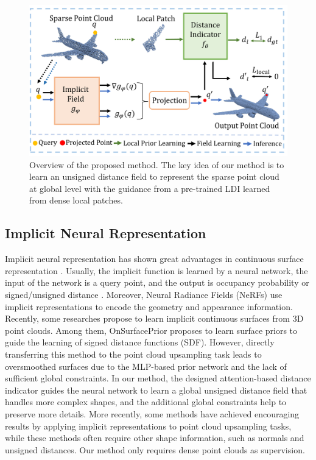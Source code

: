 \documentclass[letterpaper]{article} %
\begin{document}
\begin{figure}
\centering
\includegraphics[width=0.95\linewidth]{overview_part1.pdf}
\caption{Overview of the proposed method. The key idea of our method is to learn an unsigned distance field to represent the sparse point cloud at global level with the guidance from a pre-trained LDI learned from dense local patches.}
\label{fig:overview}
\end{figure} 

\subsection{Implicit Neural Representation}
Implicit neural representation has shown great advantages in continuous surface representation \cite{zhang2023fast, ma2023towards}. Usually, the implicit function is learned by a neural network, the input of the network is a query point, and the output is occupancy probability \cite{mescheder2019occupancy, chen2019learning} or signed/unsigned distance \cite{park2019deepsdf, michalkiewicz2019implicit}. Moreover, Neural Radiance Fields (NeRFs) \cite{mildenhall2021nerf} use implicit representations to encode the geometry and appearance information. Recently, some researches \cite{ ma2022reconstructing, zhou2023levelset, jin2023multi, chen2023gridpull} propose to learn implicit continuous surfaces from 3D point clouds. Among them, OnSurfacePrior \cite{ma2022reconstructing} proposes to learn surface priors to guide the learning of signed distance functions (SDF). However, directly transferring this method to the point cloud upsampling task leads to oversmoothed surfaces due to the MLP-based prior network and the lack of sufficient global constraints. In our method, the designed attention-based distance indicator guides the neural network to learn a global unsigned distance field that handles more complex shapes, and the additional global constraints help to preserve more details.
More recently, some methods \cite{zhao2022self, zhao2023self} have achieved encouraging results by applying implicit representations to point cloud upsampling tasks, while these methods often require other shape information, such as normals and unsigned distances. Our method only requires dense point clouds as supervision.
\end{document}
